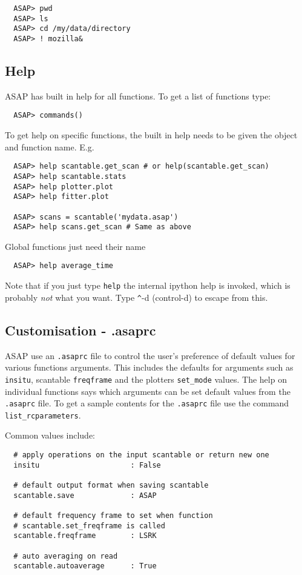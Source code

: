 \documentclass[11pt]{article}
\newcommand{\cmd}[1]{{\tt #1}}
\begin{document}
\begin{verbatim}
  ASAP> pwd
  ASAP> ls
  ASAP> cd /my/data/directory
  ASAP> ! mozilla&
\end{verbatim}

\subsection{Help}

ASAP has built in help for all functions. To get a list of
functions type:

\begin{verbatim}
  ASAP> commands()
\end{verbatim}

To get help on specific functions, the built in help needs to be given
the object and function name. E.g.

\begin{verbatim}
  ASAP> help scantable.get_scan # or help(scantable.get_scan)
  ASAP> help scantable.stats
  ASAP> help plotter.plot
  ASAP> help fitter.plot

  ASAP> scans = scantable('mydata.asap')
  ASAP> help scans.get_scan # Same as above
\end{verbatim}

Global functions just need their name

\begin{verbatim}
  ASAP> help average_time
\end{verbatim}

Note that if you just type \cmd{help} the internal ipython help is
invoked, which is probably {\em not} what you want. Type \verb+^+-d
(control-d) to escape from this.

\subsection{Customisation - .asaprc}

ASAP use an \cmd{.asaprc} file to control the user's
preference of default values for various functions arguments. This
includes the defaults for arguments such as \cmd{insitu}, scantable
\cmd{freqframe} and the plotters \cmd{set\_mode} values. The help on
individual functions says which arguments can be set default values
from the \cmd{.asaprc} file. To get a sample contents for the
\cmd{.asaprc} file use the command \cmd{list\_rcparameters}.

Common values include:
\begin{verbatim}
  # apply operations on the input scantable or return new one
  insitu                     : False

  # default output format when saving scantable
  scantable.save             : ASAP

  # default frequency frame to set when function
  # scantable.set_freqframe is called
  scantable.freqframe        : LSRK

  # auto averaging on read
  scantable.autoaverage      : True
\end{verbatim}
\end{document}
